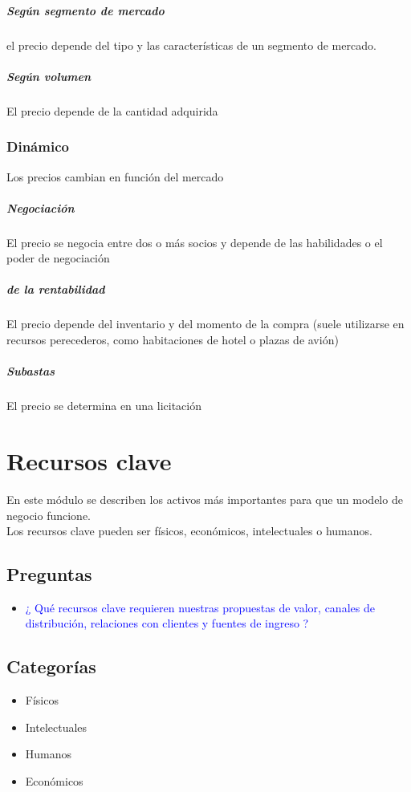 \documentclass[11pt]{book}
\begin{document}
\begin{itemize}
\paragraph{Según segmento de mercado}
el precio depende del tipo y las características de un segmento de mercado.
\paragraph{Según volumen}
El precio depende de la cantidad adquirida
\subsection{Dinámico}
Los precios cambian en función del mercado
\paragraph{Negociación}
El precio se negocia entre dos o más socios y depende de las habilidades o el poder de negociación
\paragraph{de la rentabilidad}
El precio depende del inventario y del momento de la compra (suele utilizarse en recursos perecederos, como habitaciones de hotel o plazas de avión)
\paragraph{Subastas}
El precio se determina en una licitación
\end{itemize}
\chapter{Recursos clave}
En este módulo se describen los activos más importantes para que un modelo de negocio funcione.\\
Los recursos clave pueden ser físicos, económicos, intelectuales o humanos.
\section{Preguntas}
\begin{itemize}
\item\textcolor{blue}{¿ Qué recursos clave requieren nuestras propuestas de valor, canales de distribución, relaciones con clientes y fuentes de ingreso ?}
\end{itemize}
\section{Categorías}
\begin{itemize}
\item Físicos
\item Intelectuales
\item Humanos 
\item Económicos 
\end{itemize}
\end{document}
